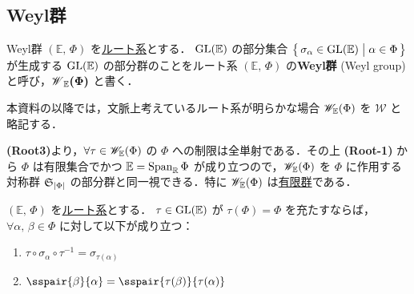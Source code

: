 \documentclass[rep_main]{subfiles}
\begin{document}
\subsection{Weyl群}

\begin{mydef}[label=def:Weylgroup]{Weyl群}
	$(\mathbb{E},\, \Phi)$ を\hyperref[ax:root-system]{ルート系}とする．
	$\mathrm{GL} (\mathbb{E})$ の部分集合 $\bigl\{\, \sigma_\alpha \in \mathrm{GL}(\mathbb{E}) \bigm| \alpha \in \Phi \,\bigr\}$ が生成する $\mathrm{GL}(\mathbb{E})$ の部分群のことをルート系 $(\mathbb{E},\, \Phi)$ の\textbf{Weyl群} (Weyl group) と呼び，$\bm{\mathscr{W}_{\mathbb{E}}(\Phi)}$ と書く．
	
	
\end{mydef}

\begin{marker}
	本資料の以降では，文脈上考えているルート系が明らかな場合 $\mathscr{W}_{\mathbb{E}}(\Phi)$ を $\bm{\mathscr{W}}$ と略記する．
\end{marker}


\textsf{\textbf{(Root3)}}より，$\forall \tau \in \mathscr{W}_{\mathbb{E}}(\Phi)$ の $\Phi$ への制限は全単射である．その上 \textsf{\textbf{(Root-1)}} から $\Phi$ は有限集合でかつ $\mathbb{E} = \operatorname{Span}_{\mathbb{R}} \Phi$ が成り立つので，$\mathscr{W}_{\mathbb{E}}(\Phi)$ を $\Phi$ に作用する対称群 $\mathfrak{S}_{\abs{\Phi}}$ の部分群と同一視できる．特に $\mathscr{W}_{\mathbb{E}}(\Phi)$ は\underline{有限群}である．

\begin{mylem}[label=lem:Weylgroup]{}
	$(\mathbb{E},\, \Phi)$ を\hyperref[ax:root-system]{ルート系}とする．
	$\tau \in \mathrm{GL}(\mathbb{E})$ が $\tau(\Phi) = \Phi$ を充たすならば，$\forall \alpha,\, \beta \in \Phi$ に対して以下が成り立つ：
	\begin{enumerate}
		\item $\tau \circ \sigma_\alpha \circ \tau^{-1} = \sigma_{\tau(\alpha)}$
		\item $\sspair{\beta}{\alpha} = \sspair{\tau(\beta)}{\tau(\alpha)}$
	\end{enumerate}
\end{mylem}
\end{document}
